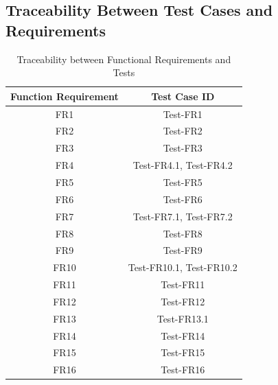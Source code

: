 \documentclass[12pt, titlepage]{article}
\begin{document}
\subsection{Traceability Between Test Cases and Requirements}
\begin{table}[H]
    \centering
    \begin{tabular}{|c|c|}
    \hline
    Function Requirement     &  Test Case ID\\
    \hline
    FR1     & Test-FR1\\
    \hline
    FR2 & Test-FR2\\
    \hline
    FR3 & Test-FR3\\
    \hline
     FR4 & Test-FR4.1, Test-FR4.2\\
    \hline
     FR5 & Test-FR5\\
    \hline
     FR6 & Test-FR6\\
    \hline
     FR7 & Test-FR7.1, Test-FR7.2\\
    \hline
     FR8 & Test-FR8\\
    \hline
     FR9 & Test-FR9\\
    \hline
     FR10 & Test-FR10.1, Test-FR10.2\\
    \hline
     FR11 & Test-FR11\\
    \hline 
     FR12 & Test-FR12\\
    \hline
    FR13 & Test-FR13.1\\
    \hline
    FR14 & Test-FR14\\
    \hline
    FR15 & Test-FR15\\
    \hline
    FR16 & Test-FR16\\
    \hline
    \end{tabular}
    \caption{Traceability between Functional Requirements and Tests}
\end{table}
\end{document}
